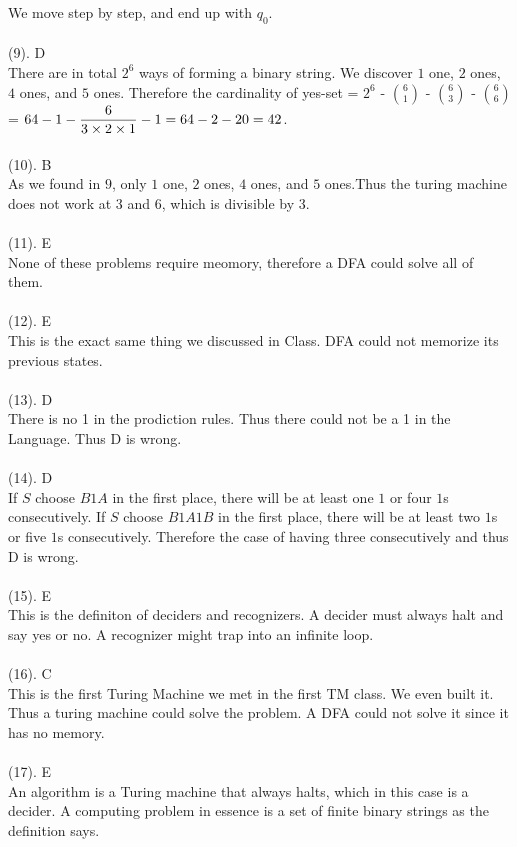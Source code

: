\documentclass{article}
\begin{document}
	We move step by step, and end up with $q_0$.\\\\
	(9). D\\
	There are in total $2^6$ ways of forming a binary string. We discover $1$ one, $2$ ones, $4$ ones, and $5$ ones. Therefore the cardinality of yes-set = $2^6$ - $\binom{6}{1}$ - $\binom{6}{3}$ - $\binom{6}{6}$ = $64-1-\dfrac{6 \time 5 \time 4}{3 \times 2 \times 1} - 1 = 64-2-20 = 42$.\\\\
	(10). B\\
	As we found in $9$, only $1$ one, $2$ ones, $4$ ones, and $5$ ones.Thus the turing machine does not work at $3$ and $6$, which is divisible by 3.\\\\
	(11). E\\
	None of these problems require meomory, therefore a DFA could solve all of them.\\\\
	(12). E\\
	This is the exact same thing we discussed in Class. DFA could not memorize its previous states.\\\\
	(13). D\\
	There is no 1 in the prodiction rules. Thus there could not be a 1 in the Language. Thus D is wrong.\\\\
	(14). D\\
	If $S$ choose $B1A$ in the first place, there will be at least one $1$ or four $1$s consecutively. If $S$ choose $B1A1B$ in the first place, there will be at least two $1$s or five $1$s consecutively. Therefore the case of having three consecutively and thus D is wrong.\\\\ 
	(15). E\\
	This is the definiton of deciders and recognizers. A decider must always halt and say yes or no. A recognizer might trap into an infinite loop.\\\\
	(16). C\\
	This is the first Turing Machine we met in the first TM class. We even built it. Thus a turing machine could solve the problem. A DFA could not solve it since it has no memory.\\\\
	(17). E\\
	An algorithm is a Turing machine that always halts, which in this case is a decider. A computing problem in essence is a set of finite binary strings as the definition says.\\\\
\end{document}
